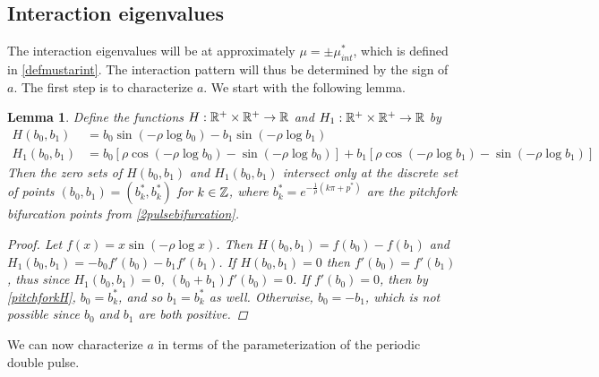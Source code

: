 \documentclass[12pt]{elsarticle}
\theoremstyle{plain}
\newtheorem{lemma}[theorem]{Lemma}
\theoremstyle{definition}
\theoremstyle{remark}
\numberwithin{theorem}{section}
\numberwithin{equation}{section}
\begin{document}
\subsection{Interaction eigenvalues}\label{sec:2pinteigs}

The interaction eigenvalues will be at approximately $\mu = \pm \mu_{int}^*$, which is defined in \cref{defmustarint}. The interaction pattern will thus be determined by the sign of $a$. The first step is to characterize $a$. We start with the following lemma.

\begin{lemma}\label{lemma:Hoverlaplemma}
Define the functions $H: \mathbb{R}^+ \times \mathbb{R}^+ \rightarrow \mathbb{R}$ and $H_1: \mathbb{R}^+ \times \mathbb{R}^+ \rightarrow \mathbb{R}$ by 
\begin{align}
H(b_0, b_1) &= b_0 \sin \left( -\rho \log b_0 \right) - b_1 \sin \left( -\rho \log b_1 \right) \label{perdefH} \\
H_1(b_0, b_1) &= b_0 \left[ \rho \cos \left( -\rho \log b_0 \right) - \sin \left( -\rho \log b_0 \right) \right] + b_1 \left[ \rho \cos \left( -\rho \log b_1 \right) - \sin \left( -\rho \log b_1 \right) \right] \label{perdefH1}
\end{align}
Then the zero sets of $H(b_0, b_1)$ and $H_1(b_0, b_1)$ intersect only at the discrete set of points $(b_0, b_1) = (b_k^*, b_k^*)$ for $k \in \mathbb{Z}$, where $b^*_k = e^{-\frac{1}{\rho} (k \pi + p^*) }$ are the pitchfork bifurcation points from \cref{2pulsebifurcation}.
\begin{proof}
Let $f(x) = x \sin \left( -\rho \log x \right)$. Then $H(b_0, b_1) = f(b_0) - f(b_1)$ and $H_1(b_0, b_1) = -b_0 f'(b_0) - b_1 f'(b_1)$. If $H(b_0, b_1) = 0$ then $f'(b_0) = f'(b_1)$, thus since $H_1(b_0, b_1) = 0$, $(b_0 + b_1) f'(b_0) = 0$. If $f'(b_0) = 0$, then by \cref{pitchforkH}, $b_0 = b_k^*$, and so $b_1 = b_k^*$ as well. Otherwise, $b_0 = -b_1$, which is not possible since $b_0$ and $b_1$ are both positive.
\end{proof}
\end{lemma}

We can now characterize $a$ in terms of the parameterization of the periodic double pulse. 
\end{document}
